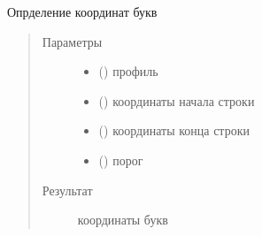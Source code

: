 \documentclass[letterpaper,10pt,russian]{sphinxmanual}
\begin{document}

\begin{fulllineitems}
\label{\detokenize{TextProfiler:TextProfiler.get_letters_in_row}}
Опрделение координат букв
\begin{quote}\begin{description}
\item[{Параметры}] \leavevmode\begin{itemize}
\item {} 
 () \textendash{} профиль

\item {} 
 () \textendash{} координаты начала строки

\item {} 
 () \textendash{} координаты конца строки

\item {} 
 () \textendash{} порог

\end{itemize}

\item[{Результат}] \leavevmode
{} \textendash{} координаты букв

\end{description}\end{quote}

\end{fulllineitems}

\end{document}
